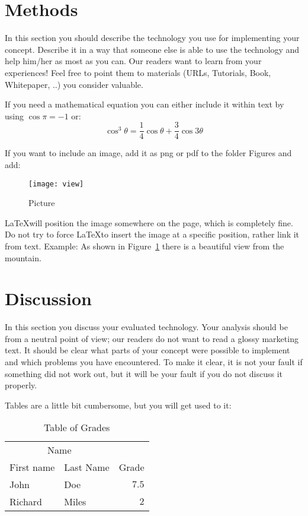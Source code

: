 \documentclass[fleqn,10pt]{SelfArx} %
\begin{document}
\section*{Methods}

In this section you should describe the technology you use for implementing your concept. Describe it in a way that someone else is able to use the technology and help him/her as most as you can. Our readers want to learn from your experiences! Feel free to point them to materials (URLs, Tutorials, Book, Whitepaper, ..) you consider valuable. 

\noindent If you need a mathematical equation you can either include it within text by using $\cos\pi=-1$ or: 
\begin{equation}
	\cos^3 \theta =\frac{1}{4}\cos\theta+\frac{3}{4}\cos 3\theta
	\label{eq:refname2}
\end{equation}

\noindent If you want to include an image, add it as png or pdf to the folder Figures and add:
\begin{figure}[ht]\centering %
	\texttt{[image: view]}  %
	\caption{Picture}
	\label{fig:view}  %
\end{figure} 

\LaTeX will position the image somewhere on the page, which is completely fine. Do not try to force \LaTeX to insert the image at a specific position, rather link it from text. Example: As shown in  Figure~\ref{fig:view} there is a beautiful view from the mountain.


\section*{Discussion}

In this section you discuss your evaluated technology. Your analysis should be from a neutral point of view; our readers do not want to read a glossy marketing text. It should be clear what parts of your concept were possible to implement and which problems you have encountered. To make it clear, it is not your fault if something did not work out, but it will be your fault if you do not discuss it properly. 

\noindent Tables are a little bit cumbersome, but you will get used to it:
\begin{table}[hbt]
	\caption{Table of Grades}
	\centering
	\begin{tabular}{llr}
		\toprule
		\multicolumn{2}{c}{Name} \\
		\cmidrule(r){1-2}
		First name & Last Name & Grade \\
		\midrule
		John & Doe & $7.5$ \\
		Richard & Miles & $2$ \\
		\bottomrule
	\end{tabular}
	\label{tab:label}
\end{table}
\end{document}
